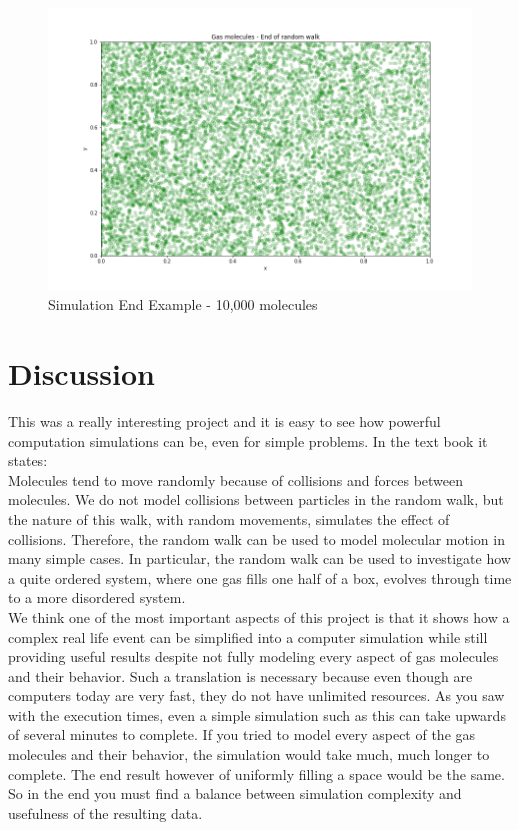 \documentclass[12pt,a4paper]{article}
\begin{document}
	\begin{figure}[!hbt]
	\centering
	\includegraphics[width=18cm]{figures/final_end}
	\caption{Simulation End Example - 10,000 molecules}
	\label{fig:simend} %
	\end{figure}
	
	\section{Discussion}\label{conclusions}

	This was a really interesting project and it is easy to see how powerful computation simulations can be, even for simple problems. In the text book it states: \\
	
	Molecules tend to move randomly because of collisions and
	forces between molecules. We do not model collisions between particles in
	the random walk, but the nature of this walk, with random movements,
	simulates the effect of collisions. Therefore, the random walk can be
	used to model molecular motion in many simple cases. In particular, the
	random walk can be used to investigate how a quite ordered system,
	where one gas fills one half of a box, evolves through time to a more
	disordered system.\cite{Langtangen:2014:PSP:2676454}\\
	
	We think one of the most important aspects of this project is that it shows how a complex real life event can be simplified into a computer simulation while still providing useful results despite not fully modeling every aspect of gas molecules and their behavior. Such a translation is necessary because even though are computers today are very fast, they do not have unlimited resources. As you saw with the execution times, even a simple simulation such as this can take upwards of several minutes to complete. If you tried to model every aspect of the gas molecules and their behavior, the simulation would take much, much longer to complete. The end result however of uniformly filling a space would be the same. So in the end you must find a balance between simulation complexity and usefulness of the resulting data.

	
	
	
\end{document}
